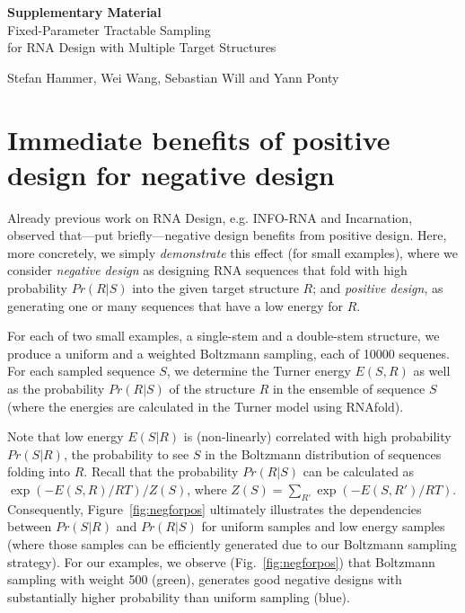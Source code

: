\documentclass[10pt]{article}
\newcommand{\Def}[1]{\emph{#1}}
\begin{document}
\onecolumn

\appendix
{\centering \Large \textbf{Supplementary Material}\\[1em] Fixed-Parameter Tractable Sampling\\ for RNA Design with Multiple Target Structures\\%
}

\medskip
\begin{center}
\large Stefan Hammer, Wei Wang, Sebastian Will and Yann Ponty
\end{center}

\section{Immediate benefits of positive design for negative design}

Already previous work on RNA Design, e.g. INFO-RNA and Incarnation, observed
that---put briefly---negative design benefits from positive design. Here, more
concretely, we simply \emph{demonstrate} this effect (for small examples), where
we consider \Def{negative design} as  
designing RNA sequences that fold with high probability $Pr(R|S)$ into the
given target structure $R$; and \Def{positive design}, as generating one or
many sequences that have a low energy for $R$.

For each of two small examples, a single-stem and a double-stem structure, we produce a uniform and a weighted Boltzmann
sampling, each of 10000 sequenes. For each sampled sequence $S$, we determine
the Turner energy $E(S,R)$ as well as the
probability $Pr(R|S)$ of the structure $R$ in the ensemble of sequence $S$ 
(where the energies are calculated in the Turner model using RNAfold). 

Note that low energy $E(S|R)$ is (non-linearly) correlated with high
probability $Pr(S|R)$, the probability to see $S$ in the Boltzmann distribution
of sequences folding into $R$. Recall that the probability $Pr(R|S)$ can be
calculated as $\exp(-E(S,R)/RT)/Z(S)$,
where $Z(S)=\sum_{R'} \exp(-E(S,R')/RT)$.
%
Consequently, Figure~\ref{fig:negforpos} ultimately illustrates the dependencies
between $Pr(S|R)$ and $Pr(R|S)$ for uniform samples and low energy samples
(where those samples can be efficiently generated due to our Boltzmann sampling
strategy). For our examples, we observe (Fig.~\ref{fig:negforpos}) that Boltzmann sampling with weight 500 (green), generates good negative designs 
with substantially higher probability than uniform sampling (blue).
\end{document}

